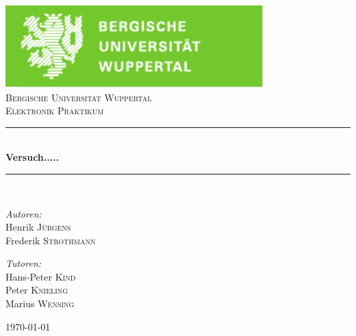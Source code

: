 \documentclass[12pt,a4paper]{article}
\begin{document}


\begin{titlepage}

\begin{center}
\includegraphics[width=0.75\textwidth]{logo.pdf}\\[1cm]    	%

\textsc{\LARGE Bergische Universität Wuppertal}\\[1.5cm]	%

\textsc{\Large Elektronik Praktikum}\\[0.5cm]				%


\newcommand{\HRule}{\rule{\linewidth}{0.5mm}}
\HRule \\[0.4cm]
{ \huge \bfseries Versuch.....}\\[0.4cm]				%

\HRule \\[1.5cm]

\begin{minipage}{0.4\textwidth}
\begin{flushleft} \large
\emph{Autoren:}\\
Henrik \textsc{Jürgens} \\
Frederik \textsc{Strothmann}
\end{flushleft}
\end{minipage}
\hfill
\begin{minipage}{0.4\textwidth}
\begin{flushright} \large
\emph{Tutoren:} \\
Hans-Peter \textsc{Kind} \\
Peter \textsc{Knieling} \\
Marius \textsc{Wensing}
\end{flushright}
\end{minipage}

\vfill

{\large \today}

\end{center}

\end{titlepage}
\end{document}
